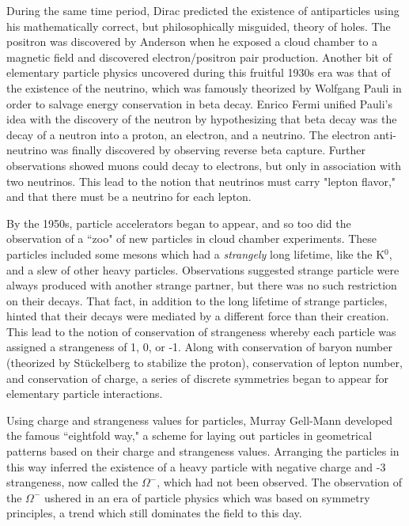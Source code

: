    During the same time period, Dirac predicted the existence of antiparticles using his mathematically correct, but philosophically misguided, theory of holes. The positron was discovered by Anderson when he exposed a cloud chamber to a magnetic field and discovered electron/positron pair production. Another bit of elementary particle physics uncovered during this fruitful 1930s era was that of the existence of the neutrino, which was famously theorized by Wolfgang Pauli in order to salvage energy conservation in beta decay. Enrico Fermi unified Pauli's idea with the discovery of the neutron by hypothesizing that beta decay was the decay of a neutron into a proton, an electron, and a neutrino. The electron anti-neutrino was finally discovered by observing reverse beta capture. Further observations showed muons could decay to electrons, but only in association with two neutrinos. This lead to the notion that neutrinos must carry "lepton flavor," and that there must be a neutrino for each lepton.

   By the 1950s, particle accelerators began to appear, and so too did the observation of a ``zoo" of new particles in cloud chamber experiments. These particles included some mesons which had a \emph{strangely} long lifetime, like the K$^0$, and a slew of other heavy particles. Observations suggested strange particle were always produced with another strange partner, but there was no such restriction on their decays. That fact, in addition to the long lifetime of strange particles, hinted that their decays were mediated by a different force than their creation. This lead to the notion of conservation of strangeness whereby each particle was assigned a strangeness of 1, 0, or -1. Along with conservation of baryon number (theorized by Stückelberg to stabilize the proton), conservation of lepton number, and conservation of charge, a series of discrete symmetries began to appear for elementary particle interactions. 

   Using charge and strangeness values for particles, Murray Gell-Mann developed the famous ``eightfold way," a scheme for laying out particles in geometrical patterns based on their charge and strangeness values. Arranging the particles in this way inferred the existence of a heavy particle with negative charge and -3 strangeness, now called the $\Omega^-$, which had not been observed. The observation of the $\Omega^-$ ushered in an era of particle physics which was based on symmetry principles, a trend which still dominates the field to this day.

